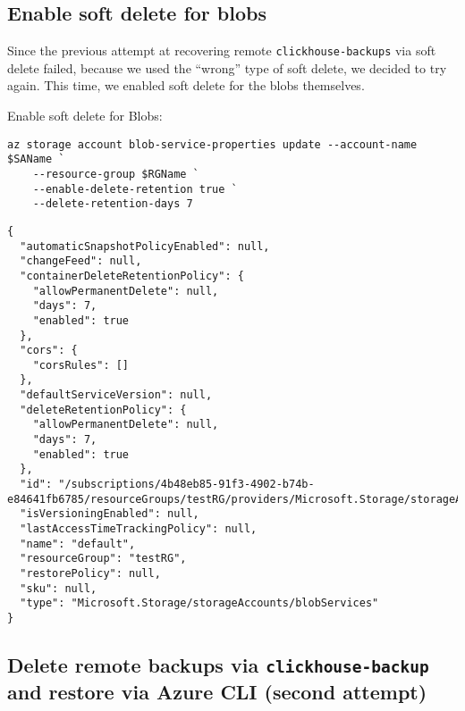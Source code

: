\subsection{Enable soft delete for blobs}
\label{sec:org351b010}
Since the previous attempt at recovering remote \texttt{clickhouse-backups} via soft delete failed,
because we used the ``wrong'' type of soft delete, we decided to try again.
This time, we enabled soft delete for the blobs themselves.

Enable soft delete for Blobs:
\begin{verbatim}
az storage account blob-service-properties update --account-name $SAName `
    --resource-group $RGName `
    --enable-delete-retention true `
    --delete-retention-days 7
\end{verbatim}

\begin{verbatim}
{
  "automaticSnapshotPolicyEnabled": null,
  "changeFeed": null,
  "containerDeleteRetentionPolicy": {
    "allowPermanentDelete": null,
    "days": 7,
    "enabled": true
  },
  "cors": {
    "corsRules": []
  },
  "defaultServiceVersion": null,
  "deleteRetentionPolicy": {
    "allowPermanentDelete": null,
    "days": 7,
    "enabled": true
  },
  "id": "/subscriptions/4b48eb85-91f3-4902-b74b-e84641fb6785/resourceGroups/testRG/providers/Microsoft.Storage/storageAccounts/chbksa/blobServices/default",
  "isVersioningEnabled": null,
  "lastAccessTimeTrackingPolicy": null,
  "name": "default",
  "resourceGroup": "testRG",
  "restorePolicy": null,
  "sku": null,
  "type": "Microsoft.Storage/storageAccounts/blobServices"
}
\end{verbatim}

\subsection{Delete remote backups via \texttt{clickhouse-backup} and restore via Azure CLI (second attempt)}
\label{sec:orge96f96c}
